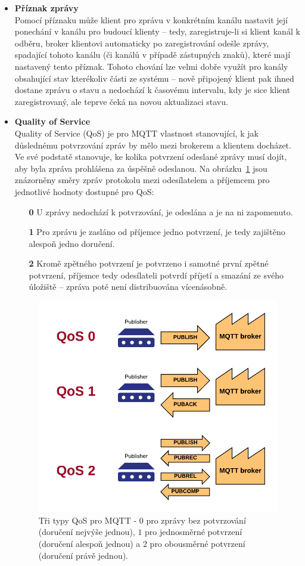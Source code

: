 \begin{itemize}
    \item \textbf{Příznak zprávy } \\
    Pomocí příznaku  může klient pro zprávu v konkrétním kanálu nastavit její ponechání v kanálu pro budoucí klienty
    -- tedy, zaregistruje-li si klient kanál k odběru, broker klientovi automaticky po zaregistrování odešle zprávy,
    spadající tohoto kanálu (či kanálů v případě zástupných znaků), které mají nastavený tento příznak.
    Tohoto chování lze velmi dobře využít pro kanály obsahující stav kterékoliv části ze systému --
    nově připojený klient pak ihned dostane zprávu o stavu a nedochází k časovému intervalu, kdy je sice klient
    zaregistrovaný, ale teprve čeká na novou aktualizaci stavu.

    \item \textbf{Quality of Service} \\
    Quality of Service (QoS) je pro MQTT vlastnost stanovující, k jak důslednému potvrzování zpráv by mělo mezi
    brokerem a klientem docházet.
    Ve své podstatě stanovuje, ke kolika potvrzení odeslané zprávy musí dojít, aby byla
    zpráva prohlášena za úspěšně odeslanou.
    Na obrázku~\ref{fig:mqtt-qos} jsou znázorněny směry zpráv protokolu mezi odesílatelem a příjemcem pro jednotlivé
    hodnoty dostupné pro QoS:

    \begin{enumerate}
        \item[\textbf{0}] U zprávy nedochází k potvrzování, je odeslána a je na ni zapomenuto.
        \item[\textbf{1}] Pro zprávu je zasláno od příjemce jedno potvrzení, je tedy zajištěno alespoň jedno doručení.
        \item[\textbf{2}] Kromě zpětného potvrzení je potvrzeno i samotné první zpětné potvrzení, příjemce tedy
        odesílateli potvrdí příjetí a smazání ze svého úložiště -- zpráva poté není distribuována vícenásobně.
    \end{enumerate}

    \begin{figure}
        \centering
        \includegraphics[width=.5\textwidth]{figures/mqtt-qos.png}
        \caption{Tři typy QoS pro MQTT - $0$ pro zprávy bez potvrzování (doručení nejvýše jednou), $1$ pro jednosměrné potvrzení (doručení alespoň jednou) a $2$ pro obousměrné potvrzení (doručení právě jednou).}
        \label{fig:mqtt-qos}
    \end{figure}


\end{itemize}
